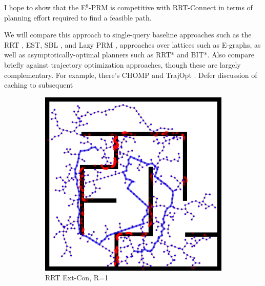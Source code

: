 I hope to show that the E$^8$-PRM is competitive with RRT-Connect
in terms of planning effort required to find a feasible path.

We will compare this approach to
single-query baseline approaches
such as the RRT \cite{kuffner2000rrtconnect},
EST, SBL \cite{sanchezante2001sbl},
and Lazy PRM \cite{bohlin2000lazyprm},
approaches over lattices such as E-graphs,
as well as asymptotically-optimal planners such as
RRT* \cite{karaman2011samplingoptimal} and BIT*.
Also compare briefly against trajectory optimization approaches,
though these are largely complementary.
For example, there's CHOMP \cite{zucker2013chomp}
and TrajOpt \cite{schulman2013trajopt}.
Defer discussion of caching to subsequent

\begin{figure}
   \centering
   \begin{subfigure}[b]{0.3\textwidth}
      \includegraphics[width=\textwidth]{figs/compare-2d-rrtc1-rrtextcon-r1-s1.png}
      \caption{RRT Ext-Con, R=1}
   \end{subfigure}%
   \quad
   \begin{subfigure}[b]{0.3\textwidth}

\end{subfigure}
\end{figure}
